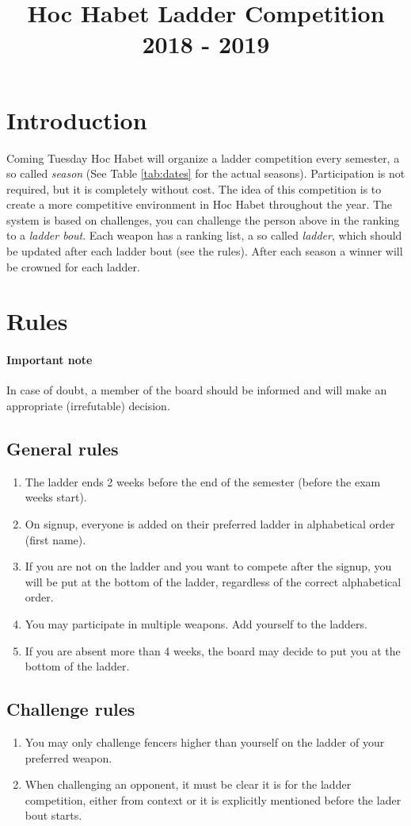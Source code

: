 \documentclass{article}
\title{Hoc Habet Ladder Competition \\ 2018 - 2019}
\author{}
\date{}
\begin{document}
\maketitle
\section{Introduction}
Coming Tuesday Hoc Habet will organize a ladder competition every semester, a so called \emph{season} (See Table \ref{tab:dates} for the actual seasons). Participation is not required, but it is completely without cost. The idea of this competition is to create a more competitive environment in Hoc Habet throughout the year. The system is based on challenges, you can challenge the person above in the ranking to a \emph{ladder bout}. Each weapon has a ranking list, a so called \emph{ladder}, which should be updated after each ladder bout (see the rules). After each season a winner will be crowned for each ladder.

\section{Rules}
\paragraph{Important note} In case of doubt, a member of the board should be informed and will make an appropriate (irrefutable) decision. 
\subsection{General rules}
\begin{enumerate}
    \item The ladder ends 2 weeks before the end of the semester (before the exam weeks start).
    \item On signup, everyone is added on their preferred ladder in alphabetical order (first name). 
    \item If you are not on the ladder and you want to compete after the signup, you will be put at the bottom of the ladder, regardless of the correct alphabetical order.
    \item You may participate in multiple weapons. Add yourself to the ladders.
    \item If you are absent more than 4 weeks, the board may decide to put you at the bottom of the ladder.
\end{enumerate}
\subsection{Challenge rules}
\begin{enumerate}
   \item You may only challenge fencers higher than yourself on the ladder of your preferred weapon.
   \item When challenging an opponent, it must be clear it is for the ladder competition, either from context or it is explicitly mentioned before the lader bout starts.
\end{enumerate}
\end{document}
